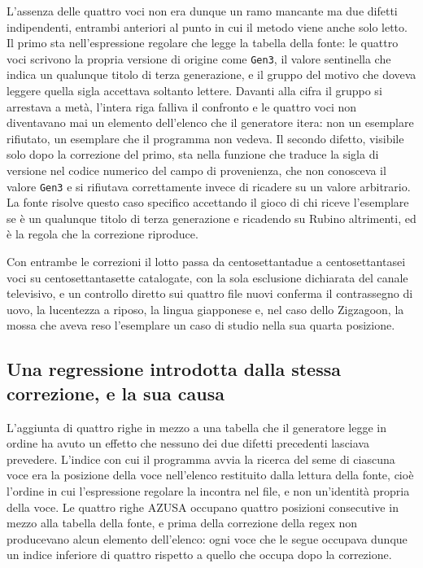 L'assenza delle quattro voci non era dunque un ramo mancante ma due difetti indipendenti, entrambi anteriori al punto in cui il metodo viene anche solo letto. Il primo sta nell'espressione regolare che legge la tabella della fonte: le quattro voci scrivono la propria versione di origine come \texttt{Gen3}, il valore sentinella che indica un qualunque titolo di terza generazione, e il gruppo del motivo che doveva leggere quella sigla accettava soltanto lettere. Davanti alla cifra il gruppo si arrestava a metà, l'intera riga falliva il confronto e le quattro voci non diventavano mai un elemento dell'elenco che il generatore itera: non un esemplare rifiutato, un esemplare che il programma non vedeva. Il secondo difetto, visibile solo dopo la correzione del primo, sta nella funzione che traduce la sigla di versione nel codice numerico del campo di provenienza, che non conosceva il valore \texttt{Gen3} e si rifiutava correttamente invece di ricadere su un valore arbitrario. La fonte risolve questo caso specifico accettando il gioco di chi riceve l'esemplare se è un qualunque titolo di terza generazione e ricadendo su Rubino altrimenti, ed è la regola che la correzione riproduce.

Con entrambe le correzioni il lotto passa da centosettantadue a centosettantasei voci su centosettantasette catalogate, con la sola esclusione dichiarata del canale televisivo, e un controllo diretto sui quattro file nuovi conferma il contrassegno di uovo, la lucentezza a riposo, la lingua giapponese e, nel caso dello Zigzagoon, la mossa che aveva reso l'esemplare un caso di studio nella sua quarta posizione.

\subsection{Una regressione introdotta dalla stessa correzione, e la sua causa}

L'aggiunta di quattro righe in mezzo a una tabella che il generatore legge in ordine ha avuto un effetto che nessuno dei due difetti precedenti lasciava prevedere. L'indice con cui il programma avvia la ricerca del seme di ciascuna voce era la posizione della voce nell'elenco restituito dalla lettura della fonte, cioè l'ordine in cui l'espressione regolare la incontra nel file, e non un'identità propria della voce. Le quattro righe AZUSA occupano quattro posizioni consecutive in mezzo alla tabella della fonte, e prima della correzione della regex non producevano alcun elemento dell'elenco: ogni voce che le segue occupava dunque un indice inferiore di quattro rispetto a quello che occupa dopo la correzione.

